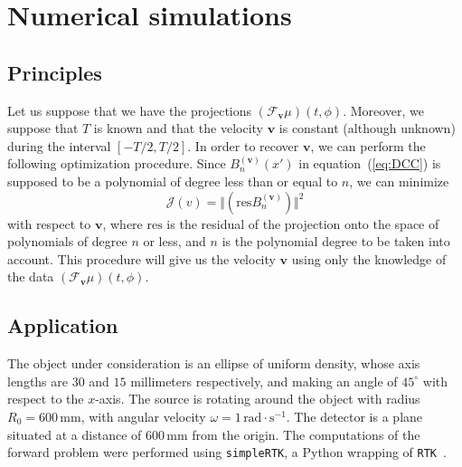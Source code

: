 \documentclass[twocolumn]{IEEEtran}
\newcommand{\bv}{\mathbf{v}}
\newcommand{\Tbv}{\mathcal{F}_{\mathbf{v}}}
\newcommand{\Bnv}{B_n^{(\bv)}}
\begin{document}
\section{Numerical simulations}

\subsection{Principles}
\label{sub:principles}
Let us suppose that we have the projections $\left( \Tbv \mu \right)(t,\phi)$. Moreover, we suppose that $T$ is known and that the velocity $\bv$ is constant (although unknown) during the interval $[-T/2, T/2]$. In order to recover $\bv$, we can perform the following optimization procedure. Since $\Bnv(x')$ in equation~(\ref{eq:DCC}) is supposed to be a polynomial of degree less than or equal to $n$, we can minimize
\begin{equation}
	\mathcal{J}(v) = \Vert \left( \textrm{res} \Bnv \right) \Vert^2
\label{eq:Jv}
\end{equation}
with respect to $\bv$, where $\textrm{res}$ is the residual of the projection onto the space of polynomials of degree $n$ or less, and $n$ is the polynomial degree to be taken into account. This procedure will give us the velocity $\bv$ using only the knowledge of the data $\left( \Tbv \mu \right)(t,\phi)$.

\subsection{Application}
\label{sub:application}

The object under consideration is an ellipse of uniform density, whose axis lengths are $30$ and $15$ millimeters respectively, and making an angle of $45^{\circ}$ with respect to the $x$-axis. The source is rotating around the object with radius $R_0 = 600 \, \textrm{mm}$, with angular velocity $\omega = 1 \, \textrm{rad} \cdot \textrm{s}^{-1}$. The detector is a plane situated at a distance of $600 \, \textrm{mm}$ from the origin. The computations of the forward problem were performed using \verb+simpleRTK+, a Python wrapping of \verb+RTK+~\cite{RTK}.
\end{document}
